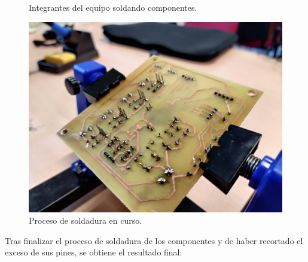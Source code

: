 \begin{enumerate}
    \begin{figure}[H]
    \centering
    \hfill
    \caption{Integrantes del equipo soldando componentes.}
    \end{figure}
    

    \begin{figure}[H]
    \centering 
    \includegraphics[width=0.45\linewidth]{pictures/PreSoldado2.jpg}
    \caption{Proceso de soldadura en curso.}
    \end{figure}
    
    Tras finalizar el proceso de soldadura de los componentes y de haber recortado el exceso de sus pines, se obtiene el resultado final:



\end{enumerate}
